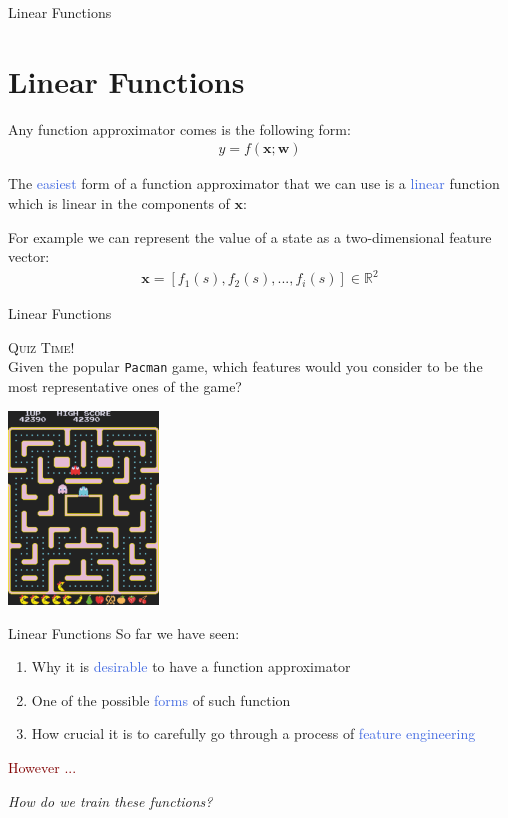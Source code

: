 \documentclass{beamer}
\newenvironment{takeaway}[1]{%
	\definecolor{shadecolor}{gray}{0.9}%
		\begin{shaded}{\color{skymagenta}\noindent\textsc{#1}}\\%
		}{%
		\end{shaded}%
}
\begin{document}
\begin{frame}{Linear Functions}
	\section{Linear Functions}

	Any function approximator comes is the following form:
	\begin{align*}
		y = f(\mathbf{x};\mathbf{w})
	\end{align*}


	The \textcolor{RoyalBlue}{easiest} form of a function approximator that we can use is a \textcolor{RoyalBlue}{linear} function 	which is linear in the components of $\mathbf{x}$:

	\bigskip

	For example we can represent the value of a state as a two-dimensional feature vector: 
	\begin{align*}
		\mathbf{x}=[f_1(s), f_2(s), ..., f_i(s)] \in \mathds{R}^2
	\end{align*}

\end{frame}


\begin{frame}{Linear Functions}
	\begin{takeaway}{Quiz Time!}
		Given the popular \texttt{Pacman} game, which features would you consider to be the most representative ones of the game?
	
	\end{takeaway}
	\begin{center}
		\includegraphics[width=4cm]{./Images/p}
	\end{center}

\end{frame}

\begin{frame}{Linear Functions}
	So far we have seen:
	\begin{enumerate}
		\item Why it is \textcolor{RoyalBlue}{desirable} to have a function approximator
		\item One of the possible \textcolor{RoyalBlue}{forms} of such function 
		\item How crucial it is to carefully go through a process of \textcolor{RoyalBlue}{feature engineering} 
	\end{enumerate}
	\bigskip

	\centering

	\textcolor{Maroon}{However ...}

	\bigskip
	\textit{How do we train these functions?}

\end{frame}
\end{document}
